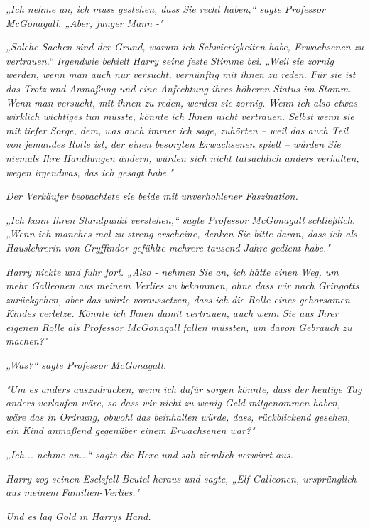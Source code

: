 {\emph{„Ich nehme an, ich muss gestehen, dass Sie recht haben,“ sagte Professor McGonagall. „Aber, junger Mann -"}

\emph{„Solche Sachen sind der Grund, warum ich Schwierigkeiten habe, Erwachsenen zu vertrauen.“ Irgendwie behielt Harry seine feste Stimme bei. „Weil sie zornig werden, wenn man auch nur} \emph{\emph{versucht,}} \emph{vernünftig mit ihnen zu reden. Für sie ist das Trotz und Anmaßung und eine Anfechtung ihres höheren Status im Stamm. Wenn man versucht, mit ihnen zu reden, werden sie} \emph{\emph{zornig.}} \emph{Wenn ich also etwas} \emph{\emph{wirklich wichtiges}} \emph{tun müsste, könnte ich Ihnen nicht vertrauen. Selbst wenn sie mit tiefer Sorge, dem, was auch immer ich sage, zuhörten -- weil das auch Teil von jemandes} \emph{\emph{Rolle}} \emph{ist, der einen besorgten Erwachsenen spielt -- würden Sie niemals Ihre Handlungen ändern, würden sich nicht tatsächlich anders verhalten, wegen irgendwas, das ich gesagt habe."}

\emph{Der Verkäufer beobachtete sie beide mit unverhohlener Faszination.}

\emph{„Ich kann Ihren Standpunkt verstehen,“ sagte Professor McGonagall schließlich. „Wenn ich manches mal zu streng erscheine, denken Sie bitte daran, dass ich als Hauslehrerin von Gryffindor gefühlte mehrere tausend Jahre gedient habe."}

\emph{Harry nickte und fuhr fort. „Also - nehmen Sie an, ich hätte einen Weg, um mehr Galleonen aus meinem Verlies zu bekommen,} \emph{\emph{ohne}} \emph{dass wir nach Gringotts zurückgehen, aber das würde voraussetzen, dass ich die Rolle eines gehorsamen Kindes verletze. Könnte ich Ihnen damit vertrauen, auch wenn Sie aus Ihrer eigenen Rolle als Professor McGonagall fallen müssten, um davon Gebrauch zu machen?"}

\emph{„\emph{Was?}“ sagte Professor McGonagall.}

\emph{"Um es anders auszudrücken, wenn ich dafür sorgen könnte, dass der heutige Tag anders verlaufen wäre, so dass wir} \emph{\emph{nicht}} \emph{zu wenig Geld mitgenommen haben, wäre das in Ordnung, obwohl das beinhalten würde, dass, rückblickend gesehen, ein Kind anmaßend gegenüber einem Erwachsenen war?"}

\emph{„Ich... nehme an...“ sagte die Hexe und sah ziemlich verwirrt aus.}

\emph{Harry zog seinen Eselsfell-Beutel heraus und sagte, „Elf Galleonen, ursprünglich aus meinem Familien-Verlies."}

\emph{Und es lag Gold in Harrys Hand.}

}
